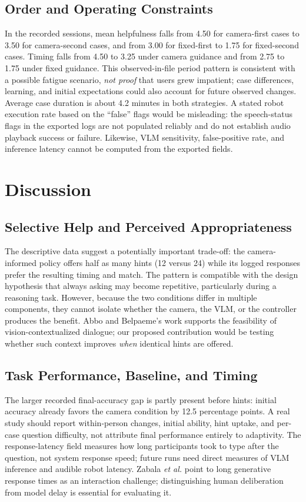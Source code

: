 \documentclass[conference]{IEEEtran}
\begin{document}
\subsection{Order and Operating Constraints}
In the recorded sessions, mean helpfulness falls from 4.50 for camera-first cases to 3.50 for camera-second cases, and from 3.00 for fixed-first to 1.75 for fixed-second cases. Timing falls from 4.50 to 3.25 under camera guidance and from 2.75 to 1.75 under fixed guidance. This observed-in-file period pattern is consistent with a possible fatigue scenario, \emph{not proof} that users grew impatient; case differences, learning, and initial expectations could also account for future observed changes. Average case duration is about 4.2 minutes in both strategies. A stated robot execution rate based on the ``false'' flags would be misleading: the speech-status flags in the exported logs are not populated reliably and do not establish audio playback success or failure. Likewise, VLM sensitivity, false-positive rate, and inference latency cannot be computed from the exported fields.

\section{Discussion}
\subsection{Selective Help and Perceived Appropriateness}
The descriptive data suggest a potentially important trade-off: the camera-informed policy offers half as many hints (12 versus 24) while its logged responses prefer the resulting timing and match. The pattern is compatible with the design hypothesis that always asking may become repetitive, particularly during a reasoning task. However, because the two conditions differ in multiple components, they cannot isolate whether the camera, the VLM, or the controller produces the benefit. Abbo and Belpaeme's work \cite{abbo2025blind} supports the feasibility of vision-contextualized dialogue; our proposed contribution would be testing whether such context improves \emph{when} identical hints are offered.

\subsection{Task Performance, Baseline, and Timing}
The larger recorded final-accuracy gap is partly present before hints: initial accuracy already favors the camera condition by 12.5 percentage points. A real study should report within-person changes, initial ability, hint uptake, and per-case question difficulty, not attribute final performance entirely to adaptivity. The response-latency field measures how long participants took to type after the question, not system response speed; future runs need direct measures of VLM inference and audible robot latency. Zabala \emph{et al.} \cite{zabala2025storytelling} point to long generative response times as an interaction challenge; distinguishing human deliberation from model delay is essential for evaluating it.
\end{document}
